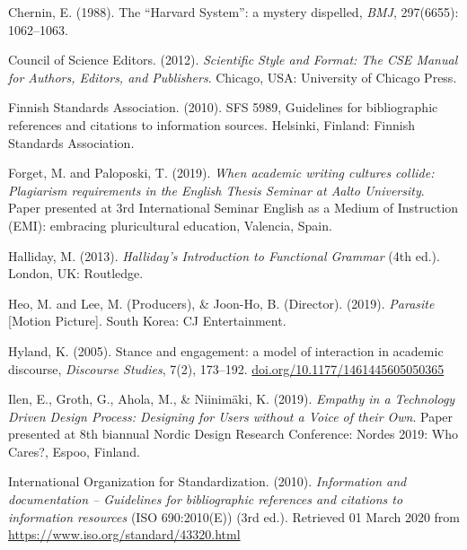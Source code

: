 \documentclass[english, 12pt, a4paper, elec, utf8, a-2b, online]{aaltothesis}
\begin{document}
\vspace{1ex}
\noindent
Chernin, E. (1988). 
The “Harvard System”: a mystery dispelled, \textit{BMJ}, 297(6655): 1062--1063.

\vspace{1ex}
\noindent
Council of Science Editors. (2012). 
\textit{Scientific Style and Format: The CSE Manual for Authors, Editors, and
	Publishers}. 
Chicago, USA: University of Chicago Press.

\vspace{1ex}
\noindent
Finnish Standards Association. (2010). SFS 5989, Guidelines for bibliographic 
references and citations to information sources. Helsinki, Finland: Finnish 
Standards Association.

\vspace{1ex}
\noindent
Forget, M. and Paloposki, T. (2019). 
\textit{When academic writing cultures collide: Plagiarism requirements in the 
	English Thesis Seminar at Aalto University}. 
Paper presented at 3rd International Seminar English as a Medium of Instruction 
(EMI): embracing pluricultural education, Valencia, Spain.

\vspace{1ex}
\noindent
Halliday, M. (2013). \textit{Halliday’s Introduction to Functional Grammar} 
(4th ed.). London, UK: Routledge.

\vspace{1ex}
\noindent
Heo, M. and Lee, M. (Producers), \& Joon-Ho, B. (Director). (2019). 
\textit{Parasite} [Motion Picture]. South Korea: CJ Entertainment.

\vspace{1ex}
\noindent
Hyland, K. (2005). 
Stance and engagement: a model of interaction in academic discourse, 
\textit{Discourse Studies}, 7(2), 173--192. 
\url{doi.org/10.1177/1461445605050365}

\vspace{1ex}
\noindent
Ilen, E., Groth, G., Ahola, M., \& Niinimäki, K. (2019). 
\textit{Empathy in a Technology Driven Design Process: Designing for Users 
	without a Voice of their Own}. 
Paper presented at 8th biannual Nordic Design Research Conference: Nordes 2019: 
Who Cares?, Espoo, Finland.

\vspace{1ex}
\noindent
International Organization for Standardization. (2010). 
\textit{Information and documentation -- Guidelines for bibliographic references
	and citations to information resources} 
(ISO 690:2010(E)) (3rd ed.). Retrieved 01 March 2020 from 
\url{https://www.iso.org/standard/43320.html}
\end{document}
